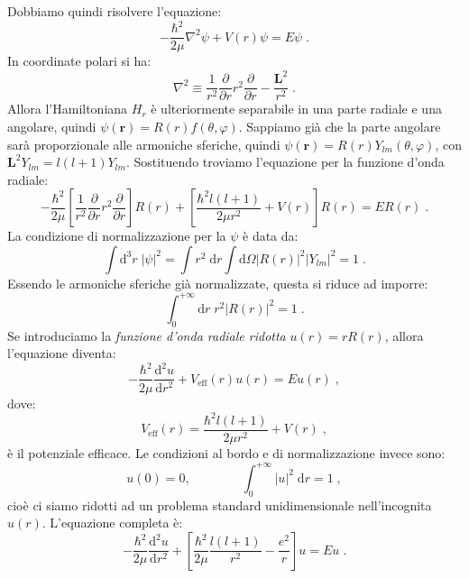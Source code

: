 \documentclass[12pt,a4paper]{report}
\theoremstyle{definition}
\newcommand{\dev}[3][]{\frac{\mathrm{d}^{#1} #2}{\mathrm{d} #3^{#1}}}
\numberwithin{equation}{section}
\newcommand{\diff}[1][]{\mathrm{d}#1}
\begin{document}
Dobbiamo quindi risolvere l'equazione:
\begin{equation}
-\frac{\hbar^2}{2\mu}\nabla^2\psi+V(r)\psi=E\psi\;.
\end{equation}
In coordinate polari si ha:
\begin{equation}
\nabla^2\equiv \frac{1}{r^2}\frac{\partial}{\partial r}r^2\frac{\partial}{\partial r}-\frac{\mathbf{L}^2}{r^2}\;.
\end{equation}
Allora l'Hamiltoniana $H_r$ è ulteriormente separabile in una parte radiale e una angolare, quindi $\psi(\mathbf{r})=R(r)f(\theta,\varphi)$. Sappiamo già che la parte angolare sarà proporzionale alle armoniche sferiche, quindi $\psi(\mathbf{r})=R(r)Y_{lm}(\theta,\varphi)$, con $\mathbf{L}^2Y_{lm}=l(l+1)Y_{lm}$. Sostituendo troviamo l'equazione per la funzione d'onda radiale:
\begin{equation}
-\frac{\hbar^2}{2\mu}\left[\frac{1}{r^2}\frac{\partial}{\partial r}r^2\frac{\partial}{\partial r}\right]R(r)+\left[\frac{\hbar^2l(l+1)}{2\mu r^2}+V(r)\right]R(r)=ER(r)\;.
\end{equation}
La condizione di normalizzazione per la $\psi$ è data da:
\begin{equation}
\int \diff^3{r}\;|\psi|^2=\int r^2\;\diff{r}\int \diff{\Omega}|R(r)|^2|Y_{lm}|^2=1\;.
\end{equation}
Essendo le armoniche sferiche già normalizzate, questa si riduce ad imporre:
\begin{equation}
\int_0^{+\infty}\diff{r}\;r^2|R(r)|^2=1\;.
\end{equation}
Se introduciamo la \textit{funzione d'onda radiale ridotta} $u(r)=rR(r)$, allora l'equazione diventa:
\begin{equation}
-\frac{\hbar^2}{2\mu}\dev[2]{u}{r}+V_{\mathrm{eff}}(r)u(r)=Eu(r)\;,
\end{equation}
dove:
\begin{equation}
V_{\mathrm{eff}}(r)=\frac{\hbar^2l(l+1)}{2\mu r^2}+V(r)\;,
\end{equation}
è il potenziale efficace. Le condizioni al bordo e di normalizzazione invece sono:
\begin{equation}
u(0)=0,\qquad\qquad \int_0^{+\infty} |u|^2\;\diff{r}=1\;,
\end{equation}
cioè ci siamo ridotti ad un problema standard unidimensionale nell'incognita $u(r)$. L'equazione completa è:
\begin{equation}
-\frac{\hbar^2}{2\mu}\dev[2]{u}{r}+\left[\frac{\hbar^2}{2\mu}\frac{l(l+1)}{r^2}-\frac{e^2}{r}\right]u=Eu\;.
\end{equation}
\end{document}

